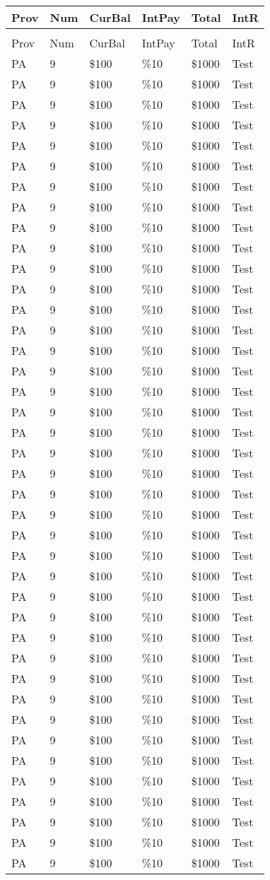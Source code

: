 \documentclass{article}%
\begin{document}
%
\normalsize%
\begin{longtabu}spread 0pt{X[r] X[r] X[r] X[r] X[r] X[r]}%
\textbf{Prov}&\textbf{Num}&\textbf{CurBal}&\textbf{IntPay}&\textbf{Total}&\textbf{IntR}\\%
\hline%
&&&&&\\%
\endhead%
Prov&Num&CurBal&IntPay&Total&IntR\\%
PA&9&\$100&\%10&\$1000&Test\\%
PA&9&\$100&\%10&\$1000&Test\\%
PA&9&\$100&\%10&\$1000&Test\\%
PA&9&\$100&\%10&\$1000&Test\\%
PA&9&\$100&\%10&\$1000&Test\\%
PA&9&\$100&\%10&\$1000&Test\\%
PA&9&\$100&\%10&\$1000&Test\\%
PA&9&\$100&\%10&\$1000&Test\\%
PA&9&\$100&\%10&\$1000&Test\\%
PA&9&\$100&\%10&\$1000&Test\\%
PA&9&\$100&\%10&\$1000&Test\\%
PA&9&\$100&\%10&\$1000&Test\\%
PA&9&\$100&\%10&\$1000&Test\\%
PA&9&\$100&\%10&\$1000&Test\\%
PA&9&\$100&\%10&\$1000&Test\\%
PA&9&\$100&\%10&\$1000&Test\\%
PA&9&\$100&\%10&\$1000&Test\\%
PA&9&\$100&\%10&\$1000&Test\\%
PA&9&\$100&\%10&\$1000&Test\\%
PA&9&\$100&\%10&\$1000&Test\\%
PA&9&\$100&\%10&\$1000&Test\\%
PA&9&\$100&\%10&\$1000&Test\\%
PA&9&\$100&\%10&\$1000&Test\\%
PA&9&\$100&\%10&\$1000&Test\\%
PA&9&\$100&\%10&\$1000&Test\\%
PA&9&\$100&\%10&\$1000&Test\\%
PA&9&\$100&\%10&\$1000&Test\\%
PA&9&\$100&\%10&\$1000&Test\\%
PA&9&\$100&\%10&\$1000&Test\\%
PA&9&\$100&\%10&\$1000&Test\\%
PA&9&\$100&\%10&\$1000&Test\\%
PA&9&\$100&\%10&\$1000&Test\\%
PA&9&\$100&\%10&\$1000&Test\\%
PA&9&\$100&\%10&\$1000&Test\\%
PA&9&\$100&\%10&\$1000&Test\\%
PA&9&\$100&\%10&\$1000&Test\\%
PA&9&\$100&\%10&\$1000&Test\\%
PA&9&\$100&\%10&\$1000&Test\\%
PA&9&\$100&\%10&\$1000&Test\\%
PA&9&\$100&\%10&\$1000&Test\\%
\end{longtabu}%
\end{document}
